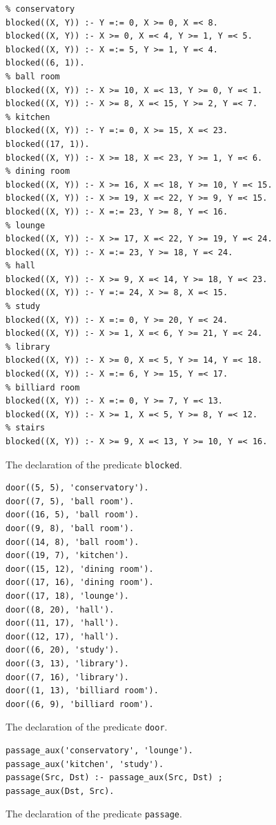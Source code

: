 \documentclass[12pt,a4paper]{article}
\newcommand{\varname}[1]{\texttt{#1}}
\newcommand{\predname}[1]{{\color{MidnightBlue}\varname{#1}}}
\begin{document}
\begin{figure}[hb]
	\centering
\begin{lstlisting}[style=Prolog-pygsty]
%% blocked((X, Y)) - point <X, Y> is inside a room or is a wall
% conservatory
blocked((X, Y)) :- Y =:= 0, X >= 0, X =< 8.
blocked((X, Y)) :- X >= 0, X =< 4, Y >= 1, Y =< 5.
blocked((X, Y)) :- X =:= 5, Y >= 1, Y =< 4.
blocked((6, 1)).
% ball room
blocked((X, Y)) :- X >= 10, X =< 13, Y >= 0, Y =< 1.
blocked((X, Y)) :- X >= 8, X =< 15, Y >= 2, Y =< 7.
% kitchen
blocked((X, Y)) :- Y =:= 0, X >= 15, X =< 23.
blocked((17, 1)).
blocked((X, Y)) :- X >= 18, X =< 23, Y >= 1, Y =< 6.
% dining room
blocked((X, Y)) :- X >= 16, X =< 18, Y >= 10, Y =< 15.
blocked((X, Y)) :- X >= 19, X =< 22, Y >= 9, Y =< 15.
blocked((X, Y)) :- X =:= 23, Y >= 8, Y =< 16.
% lounge
blocked((X, Y)) :- X >= 17, X =< 22, Y >= 19, Y =< 24.
blocked((X, Y)) :- X =:= 23, Y >= 18, Y =< 24.
% hall
blocked((X, Y)) :- X >= 9, X =< 14, Y >= 18, Y =< 23.
blocked((X, Y)) :- Y =:= 24, X >= 8, X =< 15.
% study
blocked((X, Y)) :- X =:= 0, Y >= 20, Y =< 24.
blocked((X, Y)) :- X >= 1, X =< 6, Y >= 21, Y =< 24.
% library
blocked((X, Y)) :- X >= 0, X =< 5, Y >= 14, Y =< 18.
blocked((X, Y)) :- X =:= 6, Y >= 15, Y =< 17.
% billiard room
blocked((X, Y)) :- X =:= 0, Y >= 7, Y =< 13.
blocked((X, Y)) :- X >= 1, X =< 5, Y >= 8, Y =< 12.
% stairs
blocked((X, Y)) :- X >= 9, X =< 13, Y >= 10, Y =< 16.
\end{lstlisting}
	\caption{The declaration of the predicate \predname{blocked}.} 
	\label{fig:blocked}
\end{figure}

\begin{figure}[hb]
	\centering
\begin{lstlisting}[style=Prolog-pygsty]
%% door((X, Y), R) - there's a door to room R from point <X, Y>
door((5, 5), 'conservatory').
door((7, 5), 'ball room').
door((16, 5), 'ball room').
door((9, 8), 'ball room').
door((14, 8), 'ball room').
door((19, 7), 'kitchen').
door((15, 12), 'dining room').
door((17, 16), 'dining room').
door((17, 18), 'lounge').
door((8, 20), 'hall').
door((11, 17), 'hall').
door((12, 17), 'hall').
door((6, 20), 'study').
door((3, 13), 'library').
door((7, 16), 'library').
door((1, 13), 'billiard room').
door((6, 9), 'billiard room').
\end{lstlisting}
	\caption{The declaration of the predicate \predname{door}.} 
	\label{fig:door}
\end{figure}

\begin{figure}[hb]
	\centering
\begin{lstlisting}[style=Prolog-pygsty]
%% passage(Src, Dst) - there's a passage from Src to Dst
passage_aux('conservatory', 'lounge').
passage_aux('kitchen', 'study').
passage(Src, Dst) :- passage_aux(Src, Dst) ; passage_aux(Dst, Src).
\end{lstlisting}
	\caption{The declaration of the predicate \predname{passage}.} 
	\label{fig:passage}
\end{figure}
\end{document}
